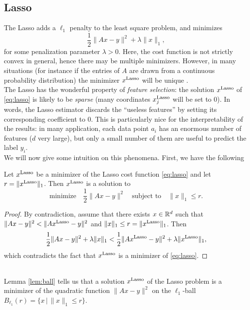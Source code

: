 \documentclass[11pt,nocut]{article}
\begin{document}
\subsection{Lasso}\label{sec:lasso}

The Lasso adds a $\ell_1$ penalty to the least square problem, and minimizes
\begin{equation}\label{eq:lasso}
\frac{1}{2} \| Ax - y \|^2 + \lambda \|x\|_1,
\end{equation}
for some penalization parameter $\lambda >0$.
Here, the cost function is not strictly convex in general, hence there may be multiple minimizers. However, in many situations (for instance if the entries of $A$ are drawn from a continuous probability distribution) the minimizer $x^{\rm Lasso}$ will be unique \cite{tibshirani2013lasso}.
\\

The Lasso has the wonderful property of \emph{feature selection}: the solution $x^{\rm Lasso}$ of \eqref{eq:lasso} is likely to be \emph{sparse} (many coordinates $x^{\rm Lasso}_j$ will be set to $0$).
In words, the Lasso estimator discards the ``useless features'' by setting its corresponding coefficient to $0$. 
This is particularly nice for the interpretability of the results: in many application, each data point $a_i$ has an enormous number of features ($d$ very large), but only a small number of them are useful to predict the label $y_i$.
\\

We will now give some intuition on this phenomena. First, we have the following

\begin{lemma}\label{lem:ball}
	Let $x^{\rm Lasso}$ be a minimizer of the Lasso cost function \eqref{eq:lasso} and let $r=\|x^{\rm Lasso}\|_1$. Then $x^{\rm Lasso}$ is a solution to
	$$
	\text{minimize} \quad \frac{1}{2} \|Ax-y\|^2 \quad
	\text{subject to} \quad \|x\|_1 \leq r.
	$$
\end{lemma}
\begin{proof}
	By contradiction, assume that there exists $x \in \mathbb{R}^d$ such that $\|Ax -y\|^2 < \|Ax^{\rm Lasso}-y\|^2$ and $\|x\|_1 \leq r = \|x^{\rm Lasso}\|_1$. Then
	$$
\frac{1}{2} \| Ax - y \|^2 + \lambda \|x\|_1 
< 
\frac{1}{2} \| Ax^{\rm Lasso} - y \|^2 + \lambda \|x^{\rm Lasso}\|_1,
$$
which contradicts the fact that $x^{\rm Lasso}$ is a minimizer of \eqref{eq:lasso}.
\end{proof}
\\

Lemma \ref{lem:ball} tells us that a solution $x^{\rm Lasso}$ of the Lasso problem is a minimizer of the quadratic function $\|Ax-y\|^2$ on the $\ell_1$-ball $B_{\ell_1}(r) = \{x \, | \, \|x\|_1 \leq r\}$.
\end{document}
